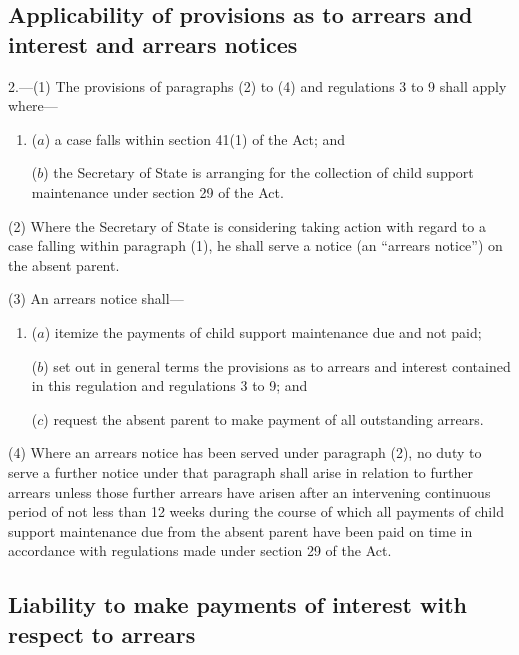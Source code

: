 \documentclass[a4paper]{article}
\newcommand{\parthead}{}
\begin{document}
\renewcommand\parthead{--- Part II}

\subsection[2. Applicability of provisions as to arrears and interest and arrears notices]{Applicability of provisions as to arrears and interest and arrears notices}

2.—(1) The provisions of paragraphs (2) to (4) and regulations 3 to 9 shall apply where—
\begin{enumerate}\item[]
($a$) a case falls within section 41(1) of the Act; and

($b$) the Secretary of State is arranging for the collection of child support maintenance under section 29 of the Act.
\end{enumerate}

(2) Where the Secretary of State is considering taking action with regard to a case falling within paragraph (1), he shall serve a notice (an “arrears notice”) on the absent parent.

(3) An arrears notice shall—
\begin{enumerate}\item[]
($a$) itemize the payments of child support maintenance due and not paid;

($b$) set out in general terms the provisions as to arrears and interest contained in this regulation and regulations 3 to 9; and

($c$) request the absent parent to make payment of all outstanding arrears.
\end{enumerate}

(4) Where an arrears notice has been served under paragraph (2), no duty to serve a further notice under that paragraph shall arise in relation to further arrears unless those further arrears have arisen after an intervening continuous period of not less than 12 weeks during the course of which all payments of child support maintenance due from the absent parent have been paid on time in accordance with regulations made under section 29 of the Act.

\subsection[3. Liability to make payments of interest with respect to arrears]{Liability to make payments of interest with respect to arrears}
\end{document}
